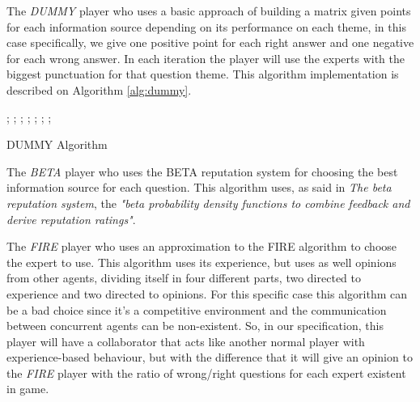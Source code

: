 \documentclass{llncs}
\begin{document}
The \textit{DUMMY} player who uses a basic approach of building a matrix given points for each information source depending on its performance on each theme, in this case specifically, we give one positive point for each right answer and one negative for each wrong answer. In each iteration the player will use the experts with the biggest punctuation for that question theme. This algorithm implementation is described on Algorithm \ref{alg:dummy}.


\begin{algorithm}
\begin{algorithmic}[1]
    ;
 	\Else
    ;
    \EndIf
  \EndFunction
  	;
  	;
			;
			;
			\EndIf
    	\EndFor
    	\EndIf
    \EndFor
    ;
  \EndFunction
\end{algorithmic}
\caption{DUMMY Algorithm}\label{alg:dummy}
\end{algorithm}

The \textit{BETA} player who uses the BETA reputation system \cite{Beta} for choosing the best information source for each question. This algorithm uses, as said in \textit{The beta reputation system}, the \textit{"beta probability density functions to combine feedback and derive reputation ratings"}\cite{Beta}.

The \textit{FIRE} player who uses an approximation to the FIRE algorithm \cite{Fire} to choose the expert to use. This algorithm uses its experience, but uses as well opinions from other agents, dividing itself in four different parts, two directed to experience and two directed to opinions. For this specific case this algorithm can be a bad choice since it's a competitive environment and the communication between concurrent agents can be non-existent. So, in our specification, this player will have a collaborator that acts like another normal player with experience-based behaviour, but with the difference that it will give an opinion to the \textit{FIRE} player with the ratio of wrong/right questions for each expert existent in game.
\end{document}
